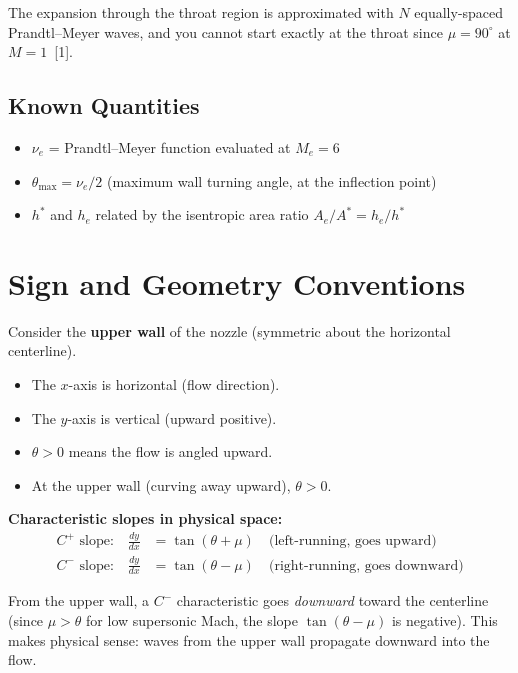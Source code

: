 \documentclass[11pt]{article}
\begin{document}
The expansion through the throat region is approximated with $N$ equally-spaced Prandtl--Meyer waves, and you cannot start exactly at the throat since $\mu = 90^\circ$ at $M=1$~[1].

\subsection{Known Quantities}
\begin{itemize}
    \item $\nu_e$ = Prandtl--Meyer function evaluated at $M_e = 6$
    \item $\theta_{\max} = \nu_e / 2$ (maximum wall turning angle, at the inflection point)
    \item $h^*$ and $h_e$ related by the isentropic area ratio $A_e/A^* = h_e/h^*$
\end{itemize}

\section{Sign and Geometry Conventions}

Consider the \textbf{upper wall} of the nozzle (symmetric about the horizontal centerline).

\begin{itemize}
    \item The $x$-axis is horizontal (flow direction).
    \item The $y$-axis is vertical (upward positive).
    \item $\theta > 0$ means the flow is angled upward.
    \item At the upper wall (curving away upward), $\theta > 0$.
\end{itemize}

\textbf{Characteristic slopes in physical space:}
\begin{align}
    C^+ \text{ slope:} \quad \frac{dy}{dx} &= \tan(\theta + \mu) \quad \text{(left-running, goes upward)} \\
    C^- \text{ slope:} \quad \frac{dy}{dx} &= \tan(\theta - \mu) \quad \text{(right-running, goes downward)}
\end{align}

From the upper wall, a $C^-$ characteristic goes \emph{downward} toward the centerline (since $\mu > \theta$ for low supersonic Mach, the slope $\tan(\theta - \mu)$ is negative). This makes physical sense: waves from the upper wall propagate downward into the flow.
\end{document}
